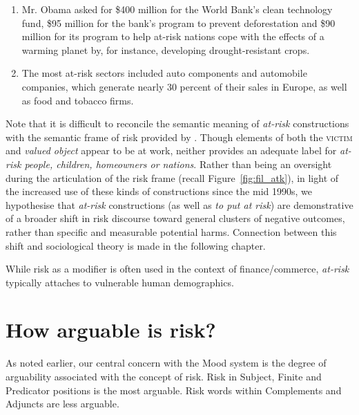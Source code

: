     \begin{enumerate}  [before=\itshape,font=\normalfont] \setlength\itemsep{0em} \small
    \item Mr. Obama asked for \$400 million for the World Bank's clean technology fund, \$95 million for the bank's program to prevent deforestation and \$90 million for its program to help at-risk nations cope with the effects of a warming planet by, for instance, developing drought-resistant crops.
    \item The most at-risk sectors included auto components and automobile companies, which generate nearly 30 percent of their sales in Europe, as well as food and tobacco firms.
    \end{enumerate}

    Note that it is difficult to reconcile the semantic meaning of \emph{at-risk} constructions with the semantic frame of risk provided by . Though elements of both the \textsc{victim} and \emph{valued object} appear to be at work, neither provides an adequate label for \emph{at-risk people, children, homeowners or nations}. Rather than being an oversight during the articulation of the risk frame (recall Figure~\ref{fig:fil_atk}), in light of the increased use of these kinds of constructions since the mid 1990s, we hypothesise that \emph{at-risk} constructions (as well as \emph{to put at risk}) are demonstrative of a broader shift in risk discourse toward general clusters of negative outcomes, rather than specific and measurable potential harms. Connection between this shift and sociological theory is made in the following chapter.

    \vspace{5mm}\noindent\begin{tcolorbox}[colback=yellow!5,colframe=yellow!40!black,title=Summary: participants modified by risk]
    \parbox{1\textwidth}{%
    While risk as a modifier is often used in the context of finance\slash commerce, \emph{at-risk} typically attaches to vulnerable human demographics.}
    \end{tcolorbox}
    \vspace{5mm}

\section{How arguable is risk?} \label{sect:arguability} \FloatBarrier

    As noted earlier, our central concern with the Mood system is the degree of arguability associated with the concept of risk. Risk in Subject, Finite and Predicator positions is the most arguable. Risk words within Complements and Adjuncts are less arguable.

